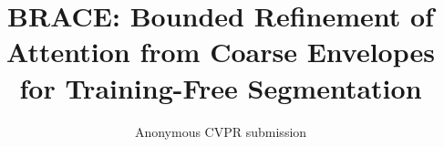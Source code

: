 \documentclass[10pt,twocolumn,letterpaper]{article}
\title{BRACE: Bounded Refinement of Attention from Coarse Envelopes\\for Training-Free Segmentation}
\author{Anonymous CVPR submission}
\begin{document}
\maketitle










{
    \small
    
    
}
\end{document}
